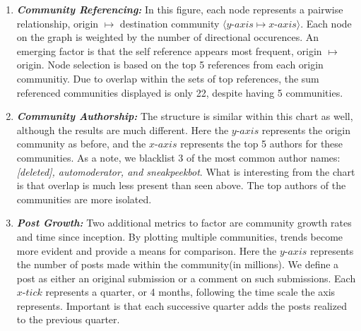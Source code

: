 \documentclass[b0paper,margin=1cm,landscape]{baposter}
\begin{document}
\begin{poster}
{  \begin{enumerate}

    \vspace{1.5mm}
    \item \textsl{\textbf{Community Referencing:}}
    \subitem In this figure, each node represents a pairwise relationship, origin $ \longmapsto $ destination community $\langle y$-$axis \longmapsto x$-$axis \rangle$.
    Each node on the graph is weighted by the number of directional occurences.
    An emerging factor is that the self reference appears most frequent, origin $ \longmapsto $ origin.
    Node selection is based on the top 5 references from each origin communitiy.
    Due to overlap within the sets of top references, the sum referenced communities displayed is only 22, despite having 5 communities.

    \vspace{1em}
    \item \textsl{\textbf{Community Authorship:}}
    \subitem The structure is similar within this chart as well, although the results are much different.
    Here the $y$-$axis$ represents the origin community as before, and the $ x $-$ axis $ represents the top 5 authors for these communities.
    As a note, we blacklist 3 of the most common author names: \textit{[deleted], automoderator, and sneakpeekbot}.
    What is interesting from the chart is that overlap is much less present than seen above. The top authors of the communities are more isolated.

    \vspace{1em}
    \item \textsl{\textbf{Post Growth:}}
    \subitem Two additional metrics to factor are community growth rates and time since inception.
    By plotting multiple communities, trends become more evident and provide a means for comparison.
    Here the $y$-$axis$ represents the number of posts made within the community(in millions).
    We define a post as either an original submission or a comment on such submissions.
    Each $x$-$tick$ represents a quarter, or 4 months, following the time scale the axis represents.
    Important is that each successive quarter adds the posts realized to the previous quarter.


\end{enumerate}}
\end{poster}
\end{document}

